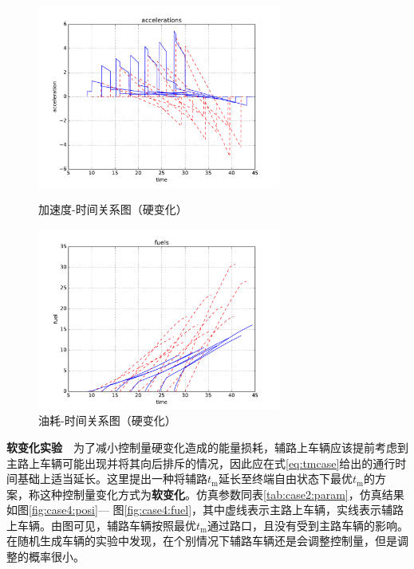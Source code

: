 \begin{figure}[htbp]
\begin{minipage}{0.48\textwidth}
  \centering
  \includegraphics[height=6cm]{figures/sim_case3/acc.pdf}
  \caption{加速度-时间关系图（硬变化）}
  \label{fig:case3:acc}
\end{minipage}\hfill
\begin{minipage}{0.48\textwidth}
  \centering
  \includegraphics[height=6cm]{figures/sim_case3/fuel.pdf}
  \caption{油耗-时间关系图（硬变化）}
  \label{fig:case3:fuel}
\end{minipage}
\end{figure}

\textbf{软变化实验}\ \
为了减小控制量硬变化造成的能量损耗，辅路上车辆应该提前考虑到主路上车辆可能出现并将其向后排斥的情况，因此应在式\ref{eq:tmcase}给出的通行时间基础上适当延长。这里提出一种将辅路$t_\mathrm{m}$延长至终端自由状态下最优$t_\mathrm{m}$的方案，称这种控制量变化方式为\textbf{软变化}。仿真参数同表\ref{tab:case2:param}，仿真结果如图\ref{fig:case4:posi}--- 图\ref{fig:case4:fuel}，其中虚线表示主路上车辆，实线表示辅路上车辆。由图可见，辅路车辆按照最优$t_\mathrm{m}$通过路口，且没有受到主路车辆的影响。在随机生成车辆的实验中发现，在个别情况下辅路车辆还是会调整控制量，但是调整的概率很小。

